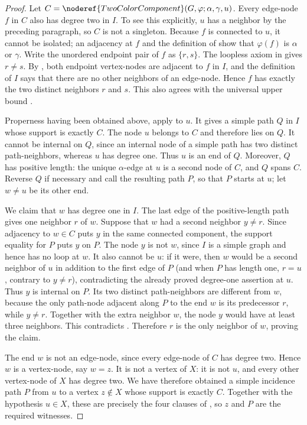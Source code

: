 \begin{proof}
Let
$C=\noderef{TwoColorComponent}(G,\varphi;\alpha,\gamma,u)$.  Every
edge-node $f$ in $C$ also has degree two in $I$.  To see this explicitly,
$u$ has a neighbor by the preceding paragraph, so $C$ is not a singleton.
Because $f$ is connected to $u$, it cannot be isolated; an adjacency at
$f$ and the definition of  show that
$\varphi(f)$ is $\alpha$ or $\gamma$.  Write the unordered endpoint pair
of $f$ as $\{r,s\}$.  The loopless axiom in
 gives $r\ne s$.  By
, both endpoint vertex-nodes are adjacent to $f$ in
$I$, and the definition of $I$ says that there are no other neighbors of
an edge-node.  Hence $f$ has exactly the two distinct neighbors $r$ and
$s$.  This also agrees with the universal upper bound
.

Properness having been obtained above, apply
 to $u$.  It gives a simple path
$Q$ in $I$ whose support is exactly $C$.  The node $u$ belongs to $C$ and
therefore lies on $Q$.  It cannot be internal on $Q$, since an internal
node of a simple path has two distinct path-neighbors, whereas $u$ has
degree one.  Thus $u$ is an end of $Q$.  Moreover, $Q$ has positive
length: the unique $\alpha$-edge at $u$ is a second node of $C$, and $Q$
spans $C$.  Reverse $Q$ if necessary and call the resulting path $P$, so
that $P$ starts at $u$; let $w\ne u$ be its other end.

We claim that $w$ has degree one in $I$.  The last edge of the
positive-length path gives one neighbor $r$ of $w$.  Suppose that $w$ had
a second neighbor $y\ne r$.  Since adjacency to $w\in C$ puts $y$ in the
same connected component, the support equality for $P$ puts $y$ on $P$.
The node $y$ is not $w$, since $I$ is a simple graph and hence has no
loop at $w$.  It also cannot be $u$: if it were, then $w$ would be a second
neighbor of $u$ in addition to the first edge of $P$ (and when $P$ has
length one, $r=u$, contrary to $y\ne r$), contradicting the already proved
degree-one assertion at $u$.  Thus $y$ is internal on $P$.  Its two
distinct path-neighbors are different from $w$, because the only path-node
adjacent along $P$ to the end $w$ is its predecessor $r$, while
$y\ne r$.  Together with the extra neighbor $w$, the node $y$ would have
at least three neighbors.  This contradicts
.  Therefore $r$ is the only
neighbor of $w$, proving the claim.

The end $w$ is not an edge-node, since every edge-node of $C$ has degree
two.  Hence $w$ is a vertex-node, say $w=z$.  It is not a vertex of $X$:
it is not $u$, and every other vertex-node of $X$ has degree two.  We have
therefore obtained a simple incidence path $P$ from $u$ to a vertex
$z\notin X$ whose support is exactly $C$.  Together with the hypothesis
$u\in X$, these are precisely the four clauses of
, so $z$ and $P$ are the required
witnesses.
\end{proof}
